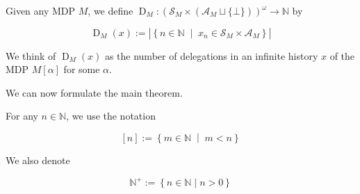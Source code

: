 \documentclass[anon,12pt]{colt2018} %
\newcommand{\AP}[1]{\left(#1\right)}
\newcommand{\AB}[1]{\left[#1\right]}
\newcommand{\AC}[1]{\left\{#1\right\}}
\newcommand{\ACM}[2]{\left\{#1\;\middle\vert\;#2\right\}}
\newcommand{\Nats}{\mathbb{N}}
\newcommand{\Abs}[1]{\left\vert #1 \right\vert}
\newcommand{\A}{\mathcal{A}}
\newcommand{\St}{\mathcal{S}}
\newcommand{\MA}[2]{#1\AB{#2}}
\newcommand{\Ad}{\alpha}
\newcommand{\ND}{\operatorname{D}}
\begin{document}
\begin{samepage}
\begin{definition}

Given any MDP $M$, we define $\ND_M: \AP{\St_M \times \AP{\A_M \sqcup \{\bot\}}}^\omega \rightarrow \Nats$ by

\begin{equation}
\ND_M(x) := \Abs{\ACM{n\in\Nats}{x_n\in\St_M\times\A_M}} 
\end{equation}

We think of $\ND_M(x)$ as the number of delegations in an infinite history $x$ of the MDP $\MA{M}{\Ad}$ for some $\alpha$.

\end{definition}
\end{samepage}

We can now formulate the main theorem.

For any $n \in \Nats$, we use the notation 

\[[n]:=\ACM{m\in\Nats}{m < n}\] 

We also denote 

\[\Nats^+:=\AC{n \in \Nats \mid n > 0}\]
\end{document}
